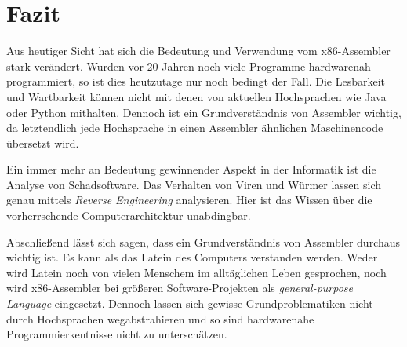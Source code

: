 \section{Fazit}
Aus heutiger Sicht hat sich die Bedeutung und Verwendung vom x86-Assembler stark verändert.
Wurden vor 20 Jahren noch viele Programme hardwarenah programmiert, so ist dies heutzutage nur noch bedingt der Fall.
Die Lesbarkeit und Wartbarkeit können nicht mit denen von aktuellen Hochsprachen wie Java oder Python mithalten.
Dennoch ist ein Grundverständnis von Assembler wichtig, da letztendlich jede Hochsprache in einen Assembler ähnlichen Maschinencode übersetzt wird.

Ein immer mehr an Bedeutung gewinnender Aspekt in der Informatik ist die Analyse von Schadsoftware.
Das Verhalten von Viren und Würmer lassen sich genau mittels \textit{Reverse Engineering} analysieren.
Hier ist das Wissen über die vorherrschende Computerarchitektur unabdingbar.

Abschließend lässt sich sagen, dass ein Grundverständnis von Assembler durchaus wichtig ist.
Es kann als das Latein des Computers verstanden werden.
Weder wird Latein noch von vielen Menschem im alltäglichen Leben gesprochen, noch wird x86-Assembler bei größeren Software-Projekten als \textit{general-purpose Language} eingesetzt.
Dennoch lassen sich gewisse Grundproblematiken nicht durch Hochsprachen wegabstrahieren und so sind hardwarenahe Programmierkentnisse nicht zu unterschätzen.
